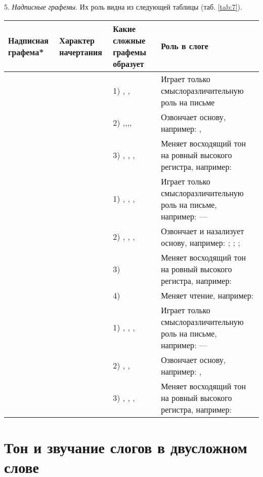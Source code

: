 5. \emph{Надписные графемы}. Их роль видна из следующей таблицы (таб. \ref{tab:7}).

\begin{tabularx}{\textwidth}{|L{4}|L{4}|L{7}|L{14}|}
	\caption{Надписные графемы}\label{tab:7}\\
	\hline
	Над\-пис\-ная графема* & Характер начертания & Какие сложные графемы образует & Роль в слоге\\
	\hline
	 &  & 1) , ,  & Играет только смыслоразличительную роль на письме\\
	& & 2) ,,,, & Озвончает основу, например: , \\
	& & 3) , , ,  & Меняет восходящий тон на ровный высокого регистра, например: \\
	\hline
	 &  & 1) , , ,  & Играет только смыслоразличительную роль на письме, например:  --- \\
	& & 2) , , ,  & Озвончает и назализует основу, например: ; ; ; \\
	& & 3)  & Меняет восходящий тон на ровный высокого регистра, например: \\
	& & 4)  & Меняет чтение, например: \\
	\hline
	 &  & 1) , , ,  & Играет только смыслоразличительную роль на письме, например:  --- \\
	& & 2) , ,  & Озвончает основу, например: , \\
	& & 3) , , ,  & Меняет восходящий тон на ровный высокого регистра, например: \\
	\hline
\end{tabularx}

\section{Тон и звучание слогов в двусложном слове}

